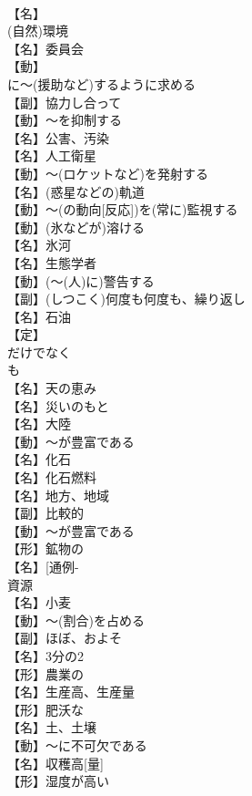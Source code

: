 \documentclass[8pt]{extreport}
\begin{document}
\begin{CJK}{UTF8}{min}
\\	【名】
\\	(自然)環境
\\	【名】委員会
\\	【動】
\\	に～(援助など)するように求める
\\	【副】協力し合って
\\	【動】～を抑制する
\\	【名】公害、汚染
\\	【名】人工衛星
\\	【動】～(ロケットなど)を発射する
\\	【名】(惑星などの)軌道
\\	【動】～(の動向[反応])を(常に)監視する
\\	【動】(氷などが)溶ける
\\	【名】氷河
\\	【名】生態学者
\\	【動】(～(人)に)警告する
\\	【副】(しつこく)何度も何度も、繰り返し
\\	【名】石油
\\	【定】
\\	だけでなく
\\	も
\\	【名】天の恵み
\\	【名】災いのもと
\\	【名】大陸
\\	【動】～が豊富である
\\	【名】化石
\\	【名】化石燃料
\\	【名】地方、地域
\\	【副】比較的
\\	【動】～が豊富である
\\	【形】鉱物の
\\	【名】[通例-
\\	資源
\\	【名】小麦
\\	【動】～(割合)を占める
\\	【副】ほぼ、およそ
\\	【名】3分の2
\\	【形】農業の
\\	【名】生産高、生産量
\\	【形】肥沃な
\\	【名】土、土壌
\\	【動】～に不可欠である
\\	【名】収穫高[量]
\\	【形】湿度が高い

\end{CJK}
\end{document}
